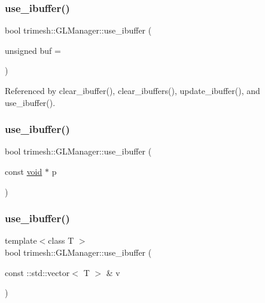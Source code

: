 \subsubsection{\texorpdfstring{use\+\_\+ibuffer()}{use\_ibuffer()}\hspace{0.1cm}{\footnotesize\ttfamily [1/3]}}
{\footnotesize\ttfamily bool trimesh\+::\+G\+L\+Manager\+::use\+\_\+ibuffer (\begin{DoxyParamCaption}\item[{unsigned}]{buf = {} }\end{DoxyParamCaption})}



Referenced by clear\+\_\+ibuffer(), clear\+\_\+ibuffers(), update\+\_\+ibuffer(), and use\+\_\+ibuffer().

\mbox{\label{classtrimesh_1_1GLManager_a3c5729f4a96f9da1ef9bea808b6083ca}} 
\subsubsection{\texorpdfstring{use\+\_\+ibuffer()}{use\_ibuffer()}\hspace{0.1cm}{\footnotesize\ttfamily [2/3]}}
{\footnotesize\ttfamily bool trimesh\+::\+G\+L\+Manager\+::use\+\_\+ibuffer (\begin{DoxyParamCaption}\item[{const \hyperlink{namespacetrimesh_a784ddfd979e1c579bda795a8edfc3f43}{void} $\ast$}]{p }\end{DoxyParamCaption})\hspace{0.3cm}{\ttfamily [inline]}}

\mbox{\label{classtrimesh_1_1GLManager_a38693672fc508e7755c951fefda1017e}} 
\subsubsection{\texorpdfstring{use\+\_\+ibuffer()}{use\_ibuffer()}\hspace{0.1cm}{\footnotesize\ttfamily [3/3]}}
{\footnotesize\ttfamily template$<$class T $>$ \\
bool trimesh\+::\+G\+L\+Manager\+::use\+\_\+ibuffer (\begin{DoxyParamCaption}\item[{const \+::std\+::vector$<$ T $>$ \&}]{v }\end{DoxyParamCaption})\hspace{0.3cm}{\ttfamily [inline]}}


